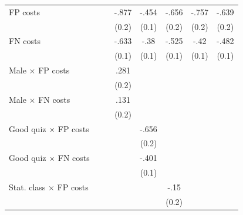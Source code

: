 {\begin{tabular}{l*{7}{c}}
FP costs        &                  &                  &    -.877\sym{***}&    -.454\sym{***}&    -.656\sym{***}&    -.757\sym{***}&    -.639\sym{***}\\
                &                  &                  &    (0.2)         &    (0.1)         &    (0.2)         &    (0.2)         &    (0.2)         \\
FN costs        &                  &                  &    -.633\sym{***}&     -.38\sym{***}&    -.525\sym{***}&     -.42\sym{***}&    -.482\sym{***}\\
                &                  &                  &    (0.1)         &    (0.1)         &    (0.1)         &    (0.1)         &    (0.1)         \\
Male $\times$ FP costs&                  &                  &     .281         &                  &                  &                  &                  \\
                &                  &                  &    (0.2)         &                  &                  &                  &                  \\
Male $\times$ FN costs&                  &                  &     .131         &                  &                  &                  &                  \\
                &                  &                  &    (0.2)         &                  &                  &                  &                  \\
Good quiz $\times$ FP costs&                  &                  &                  &    -.656\sym{***}&                  &                  &                  \\
                &                  &                  &                  &    (0.2)         &                  &                  &                  \\
Good quiz $\times$ FN costs&                  &                  &                  &    -.401\sym{***}&                  &                  &                  \\
                &                  &                  &                  &    (0.1)         &                  &                  &                  \\
Stat. class $\times$ FP costs&                  &                  &                  &                  &     -.15         &                  &                  \\
                &                  &                  &                  &                  &    (0.2)         &                  &                  \\

\end{tabular}}
